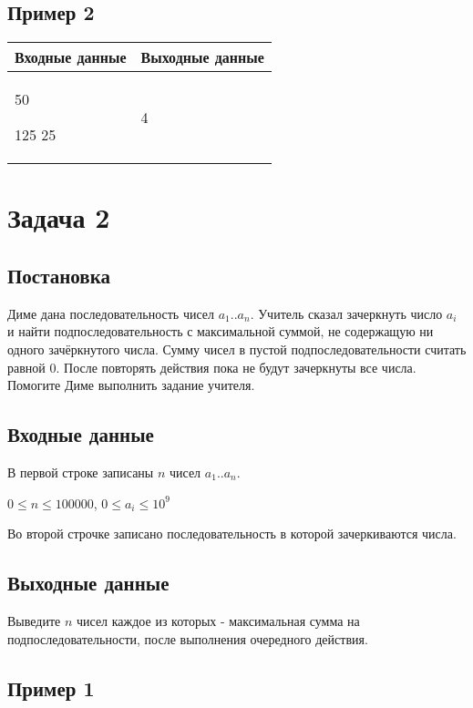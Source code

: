 \documentclass[a4]{article}
\begin{document}
\subsection*{Пример 2}
\label{sec:org2aeecb4}

\begin{table}[H]
\begin{center}
\begin{tabular}{|m{4cm}|m{4cm}|}
\hline
Входные данные & Выходные данные \\ \hline
50

125  25
&
4 
\\ \hline
\end{tabular}
\end{center}
\end{table}

\pagebreak
\section*{Задача 2}
\label{sec:orgef181bd}
\subsection*{Постановка}
\label{sec:orgad8a20e}
Диме дана последовательность чисел $a_1..a_n$. Учитель сказал зачеркнуть число $a_i$ и найти подпоследовательность с максимальной суммой, не содержащую ни одного зачёркнутого числа. Сумму чисел в пустой подпоследовательности считать равной 0. После повторять действия пока не будут зачеркнуты все числа. Помогите Диме выполнить задание учителя.

\subsection*{Входные данные}
\label{sec:orgc51833b}
В первой строке записаны $n$ чисел $a_1..a_n$.

$0\leq n \leq 100000$, $0\leq a_i \leq 10^9$

Во второй строчке записано последовательность в которой зачеркиваются числа.
\subsection*{Выходные данные}
\label{sec:orgf9da829}
Выведите $n$ чисел каждое из которых - максимальная сумма на подпоследовательности, после выполнения очередного действия. 

\subsection*{Пример 1}
\label{sec:orgd7d348d}
\end{document}
